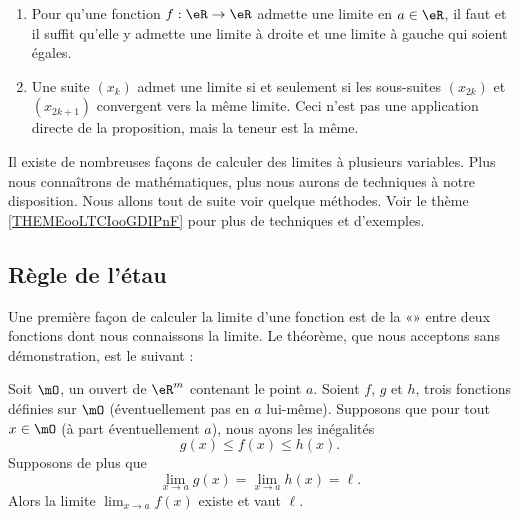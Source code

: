 \begin{example}
  \begin{enumerate}
  \item Pour qu'une fonction $f : \eR \to \eR$ admette une limite en
    $a \in \eR$, il faut et il suffit qu'elle y admette une limite à
    droite et une limite à gauche qui soient égales.

  \item Une suite $(x_k)$ admet une limite si et seulement si les
    sous-suites $(x_{2k})$ et $(x_{2k+1})$ convergent vers la même
    limite. Ceci n'est pas une application directe de la proposition,
    mais la teneur est la même.
  \end{enumerate}
\end{example}

Il existe de nombreuses façons de calculer des limites à plusieurs variables. Plus nous connaîtrons de mathématiques, plus nous aurons de techniques à notre disposition. Nous allons tout de suite voir quelque méthodes. Voir le thème \ref{THEMEooLTCIooGDIPnF} pour plus de techniques et d'exemples.

\subsection{Règle de l'étau}

Une première façon de calculer la limite d'une fonction est de la «» entre deux fonctions dont nous connaissons la limite. Le théorème, que nous acceptons sans démonstration, est le suivant :
\begin{theorem}		\label{ThoRegleEtau}
	Soit $\mO$, un ouvert de $\eR^m$ contenant le point $a$. Soient $f$, $g$ et $h$, trois fonctions définies sur $\mO$ (éventuellement pas en $a$ lui-même). Supposons que pour tout $x\in\mO$ (à part éventuellement $a$), nous ayons les inégalités
	\begin{equation}
		g(x)\leq f(x)\leq h(x).
	\end{equation}
	Supposons de plus que
	\begin{equation}
		\lim_{x\to a} g(x)=\lim_{x\to a} h(x)=\ell.
	\end{equation}
	Alors la limite $\lim_{x\to a} f(x)$ existe et vaut $\ell$.
\end{theorem}

